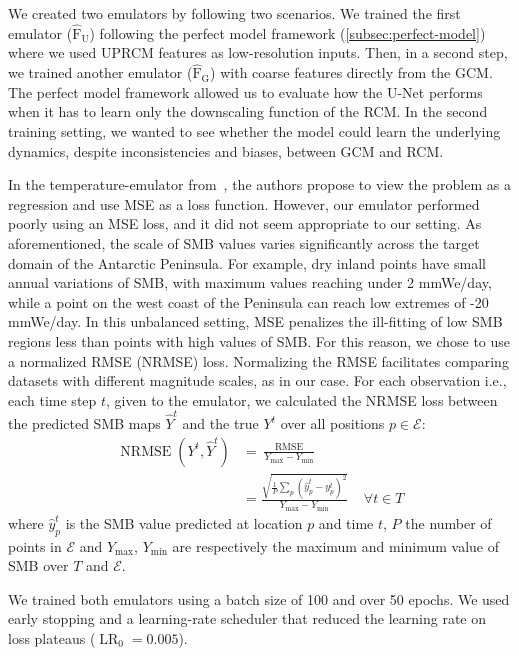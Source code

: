 \documentclass[a4paper,11pt,oneside]{report}
\begin{document}
We created two emulators by following two scenarios. We trained the first emulator ($\mathrm{\hat{F}_U}$) following the perfect model framework (\autoref{subsec:perfect-model}) where we used UPRCM features as low-resolution inputs. Then, in a second step, we trained another emulator ($\mathrm{\hat{F}_G}$) with coarse features directly from the GCM. The perfect model framework allowed us to evaluate how the U-Net performs when it has to learn only the downscaling function of the RCM. In the second training setting, we wanted to see whether the model could learn the underlying dynamics, despite inconsistencies and biases, between GCM and RCM. 


In the temperature-emulator from~\cite{Doury}, the authors propose to view the problem as a regression and use MSE as a loss function. However, our emulator performed poorly using an MSE loss, and it did not seem appropriate to our setting. As aforementioned, the scale of SMB values varies significantly across the target domain of the Antarctic Peninsula. For example, dry inland points have small annual variations of SMB, with maximum values reaching under 2 \si{mmWe/day}, while a point on the west coast of the Peninsula can reach low extremes of -20 \si{mmWe/day}. In this unbalanced setting, MSE penalizes the ill-fitting of low SMB regions less than points with high values of SMB. For this reason, we chose to use a normalized RMSE (NRMSE) loss. Normalizing the RMSE facilitates comparing datasets with different magnitude scales, as in our case. For each observation i.e., each time step $t$, given to the emulator, we calculated the NRMSE loss between the predicted SMB maps $\hat{Y}^{t}$ and the true $Y^{t}$ over all positions $p \in \mathcal{E}$:
\begin{align*}
        \operatorname{NRMSE}\left(Y^{t},\hat{Y}^{t}\right) &= \frac{\operatorname{RMSE}}{Y_{\max} - Y_{\min}} \\
         &=\frac{\sqrt{\frac{1}{P}\sum_{p}(\hat{y}_{p}^{t}-y^{t}_{p})^2}}{Y_{\max} - Y_{\min}}   \;\;\;\; \forall t \in T
\end{align*}
where $\hat{y}_{p}^{t}$ is the SMB value predicted at location $p$ and time $t$, $P$ the number of points in $\mathcal{E}$ and $Y_{\max}$, $Y_{\min}$ are respectively the maximum and minimum value of SMB over $T$ and $\mathcal{E}$.

We trained both emulators using a batch size of 100 and over 50 epochs. We used early stopping and a learning-rate scheduler that reduced the learning rate on loss plateaus ($\operatorname{LR}_0 = 0.005$). 
\end{document}
